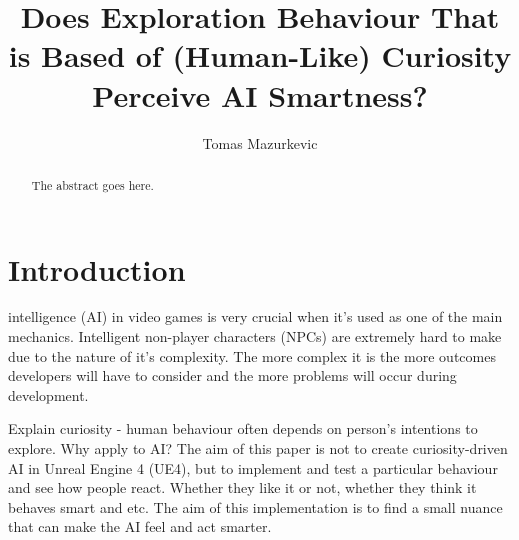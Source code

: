 \documentclass[journal]{IEEEtran}
\begin{document}
%
\title{Does Exploration Behaviour That is Based of (Human-Like) Curiosity Perceive AI Smartness?}
%
%
\author{Tomas Mazurkevic}


\maketitle

\begin{abstract}
The abstract goes here.
\end{abstract}

\section{Introduction}
% 
% 
% 
% 
 intelligence (AI) in video games is very crucial when it's used as one of the main mechanics. Intelligent non-player characters (NPCs) are extremely hard to make due to the nature of it's complexity. The more complex it is the more outcomes developers will have to consider and the more problems will occur during development. 

Explain curiosity - human behaviour often depends on person's intentions to explore. Why apply to AI? The aim of this paper is not to create curiosity-driven AI in Unreal Engine 4 (UE4), but to implement and test a particular behaviour and see how people react. Whether they like it or not, whether they think it behaves smart and etc. The aim of this implementation is to find a small nuance that can make the AI feel and act smarter.
\end{document}
